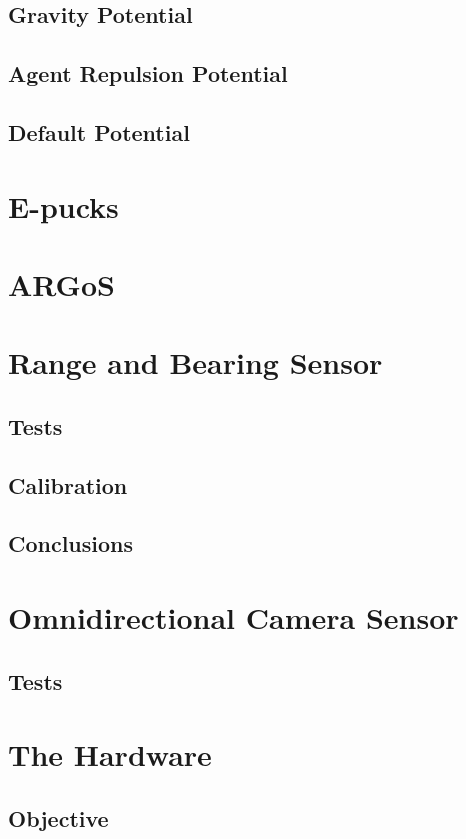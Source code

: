 \documentclass[a4paper, 12pt]{report}
\begin{document}
		\subsection{Gravity Potential}
		\subsection{Agent Repulsion Potential}
		\subsection{Default Potential}
		
	\section{E-pucks}
	
	\section{ARGoS}
	
	\section{Range and Bearing Sensor}
		\subsection{Tests}
		\subsection{Calibration}
		\subsection{Conclusions}

	\section{Omnidirectional Camera Sensor}
		\subsection{Tests}

	\section{The Hardware}
		\subsection{Objective}
\end{document}
